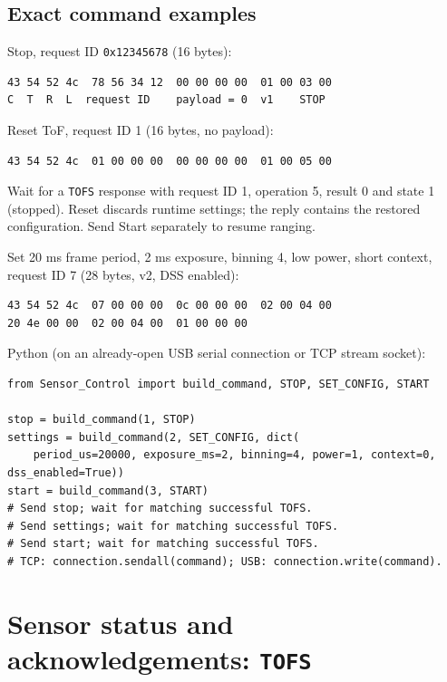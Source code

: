\documentclass[10pt,a4paper,oneside]{report}
\begin{document}
\subsection{Exact command examples}\label{wiki-protocols-wire-protocol--exact-command-examples}

Stop, request ID \texttt{0x12345678} (16 bytes):

\begin{verbatim}
43 54 52 4c  78 56 34 12  00 00 00 00  01 00 03 00
C  T  R  L  request ID    payload = 0  v1    STOP
\end{verbatim}

Reset ToF, request ID 1 (16 bytes, no payload):

\begin{verbatim}
43 54 52 4c  01 00 00 00  00 00 00 00  01 00 05 00
\end{verbatim}

Wait for a \texttt{TOFS} response with request ID 1, operation 5, result 0 and state 1 (stopped). Reset discards runtime settings; the reply contains the restored configuration. Send Start separately to resume ranging.

Set 20 ms frame period, 2 ms exposure, binning 4, low power, short context, request ID 7 (28 bytes, v2, DSS enabled):

\begin{verbatim}
43 54 52 4c  07 00 00 00  0c 00 00 00  02 00 04 00
20 4e 00 00  02 00 04 00  01 00 00 00
\end{verbatim}

Python (on an already-open USB serial connection or TCP stream socket):

\begin{verbatim}
from Sensor_Control import build_command, STOP, SET_CONFIG, START

stop = build_command(1, STOP)
settings = build_command(2, SET_CONFIG, dict(
    period_us=20000, exposure_ms=2, binning=4, power=1, context=0, dss_enabled=True))
start = build_command(3, START)
# Send stop; wait for matching successful TOFS.
# Send settings; wait for matching successful TOFS.
# Send start; wait for matching successful TOFS.
# TCP: connection.sendall(command); USB: connection.write(command).
\end{verbatim}

\section{\texorpdfstring{Sensor status and acknowledgements: \texttt{TOFS}}{Sensor status and acknowledgements: }}\label{wiki-protocols-wire-protocol--sensor-status-and-acknowledgements-tofs}
\end{document}
